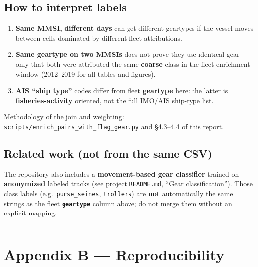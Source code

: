 \documentclass[
]{article}
\providecommand{\tightlist}{%
  \setlength{\itemsep}{0pt}\setlength{\parskip}{0pt}}
\begin{document}
\subsection*{How to interpret labels}\label{how-to-interpret-labels}

\begin{enumerate}
\def\labelenumi{\arabic{enumi}.}
\tightlist
\item
  \textbf{Same MMSI, different days} can get different geartypes if the
  vessel moves between cells dominated by different fleet
  attributions.\\
\item
  \textbf{Same geartype on two MMSIs} does not prove they use identical
  gear---only that both were attributed the same \textbf{coarse} class
  in the fleet enrichment window (2012--2019 for all tables and
  figures).\\
\item
  \textbf{AIS ``ship type''} codes differ from fleet \textbf{geartype}
  here: the latter is \textbf{fisheries-activity} oriented, not the full
  IMO/AIS ship-type list.
\end{enumerate}

Methodology of the join and weighting:
\texttt{scripts/enrich\_pairs\_with\_flag\_gear.py} and §4.3--4.4 of
this report.

\subsection*{Related work (not from the same
CSV)}\label{related-work-not-from-the-same-csv}

The repository also includes a \textbf{movement-based gear classifier}
trained on \textbf{anonymized} labeled tracks (see project
\texttt{README.md}, ``Gear classification''). Those class labels
(e.g.~\texttt{purse\_seines}, \texttt{trollers}) are \textbf{not}
automatically the same strings as the fleet \textbf{\texttt{geartype}}
column above; do not merge them without an explicit mapping.

\begin{center}\rule{0.5\linewidth}{0.5pt}\end{center}

\clearpage

\section*{Appendix B ---
Reproducibility}\label{appendix-b-reproducibility}
\end{document}
